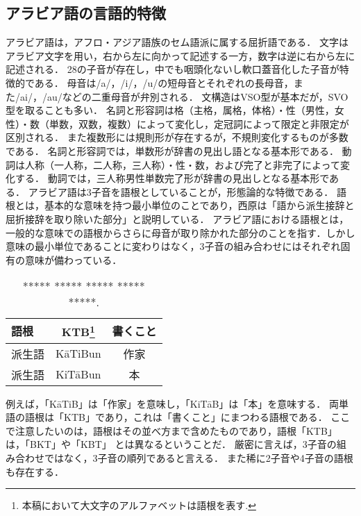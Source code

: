 \documentclass[technicalreport]{ieicej}
\begin{document}
\subsection{アラビア語の言語的特徴}
アラビア語は，アフロ・アジア語族のセム語派に属する屈折語である．
文字はアラビア文字を用い，右から左に向かって記述する一方，数字は逆に右から左に記述される．
28の子音が存在し，中でも咽頭化ないし軟口蓋音化した子音が特徴的である．
母音は/a/，/i/，/u/の短母音とそれぞれの長母音，また/ai/，/au/などの二重母音が弁別される．
文構造はVSO型が基本だが，SVO型を取ることも多い．
名詞と形容詞は格（主格，属格，体格）・性（男性，女性）・数（単数，双数，複数）によって変化し，定冠詞によって限定と非限定が区別される．
また複数形には規則形が存在するが，不規則変化するものが多数である．
名詞と形容詞では，単数形が辞書の見出し語となる基本形である．
動詞は人称（一人称，二人称，三人称）・性・数，および完了と非完了によって変化する．
動詞では，三人称男性単数完了形が辞書の見出しとなる基本形である．
アラビア語は3子音を語根としていることが，形態論的な特徴である．
語根とは，基本的な意味を持つ最小単位のことであり，西原は「語から派生接辞と屈折接辞を取り除いた部分」と説明している．
アラビア語における語根とは，一般的な意味での語根からさらに母音が取り除かれた部分のことを指す．しかし意味の最小単位であることに変わりはなく，3子音の組み合わせにはそれぞれ固有の意味が備わっている．
\begin{table}[ht]
\begin{center}
\begin{tabular}{l|cc}
   語根& KTB\footnote{本稿において大文字のアルファベットは語根を表す.} & 書くこと\\
  \hline
 派生語& KāTiBun & 作家\\
  派生語& KiTāBun & 本\\
\hline
\end{tabular}
\caption{***** ***** ***** ***** *****.}
\label{table:alignment}
\end{center}
\end{table}
例えば，「KāTiB」は「作家」を意味し，「KiTāB」は「本」を意味する．
両単語の語根は「KTB」であり，これは「書くこと」にまつわる語根である．
ここで注意したいのは，語根はその並べ方まで含めたものであり，語根「KTB」は，「BKT」や「KBT」 とは異なるということだ．
厳密に言えば，3子音の組み合わせではなく，3子音の順列であると言える．
また稀に2子音や4子音の語根も存在する．
\end{document}
